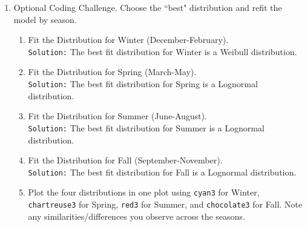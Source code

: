 \documentclass{article}\usepackage[]{graphicx}\usepackage[]{xcolor}
\begin{document}
\begin{enumerate}
  \item Optional Coding Challenge. Choose the ``best" distribution and refit the
  model by season.
  \begin{enumerate}
    \item Fit the Distribution for Winter (December-February).\\
    \texttt{Solution:} The best fit distribution for Winter is a Weibull distribution.
    \item Fit the Distribution for Spring (March-May).\\
    \texttt{Solution:} The best fit distribution for Spring is a Lognormal distribution.
    \item Fit the Distribution for Summer (June-August).\\
    \texttt{Solution:} The best fit distribution for Summer is a Lognormal distribution.
    \item Fit the Distribution for Fall (September-November).\\
    \texttt{Solution:} The best fit distribution for Fall is a Lognormal distribution.
    \item Plot the four distributions in one plot using \texttt{cyan3} for Winter,
    \texttt{chartreuse3} for Spring, \texttt{red3} for Summer, and \texttt{chocolate3}
    for Fall. Note any similarities/differences you observe across the seasons.
  \end{enumerate}
\end{enumerate}
\end{document}
